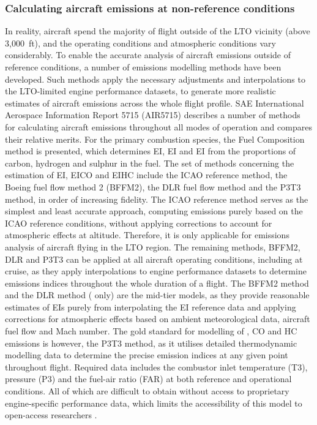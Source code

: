 \subsubsection{Calculating aircraft emissions at non-reference conditions}
In reality, aircraft spend the majority of flight outside of the LTO vicinity (above 3,000~ft), and the operating conditions and atmospheric conditions vary considerably. To enable the accurate analysis of aircraft emissions outside of reference conditions, a number of emissions modelling methods have been developed. Such methods apply the necessary adjustments and interpolations to the LTO-limited engine performance datasets, to generate more realistic estimates of aircraft emissions across the whole flight profile. SAE International Aerospace Information Report 5715 (AIR5715) \cite{AIR5715} describes a number of methods for calculating aircraft emissions throughout all modes of operation and compares their relative merits. For the primary combustion species, the Fuel Composition method is presented, which determines EI, EI and EI from the proportions of carbon, hydrogen and sulphur in the fuel. The set of methods concerning the estimation of EI, EICO and EIHC include the ICAO reference method, the Boeing fuel flow method 2 (BFFM2), the DLR fuel flow method and the P3T3 method, in order of increasing fidelity. The ICAO reference method serves as the simplest and least accurate approach, computing emissions purely based on the ICAO reference conditions, without applying corrections to account for atmospheric effects at altitude. Therefore, it is only applicable for emissions analysis of aircraft flying in the LTO region.  The remaining methods, BFFM2, DLR and P3T3 can be applied at all aircraft operating conditions, including at cruise, as they apply interpolations to engine performance datasets to determine emissions indices throughout the whole duration of a flight. The BFFM2 method and the DLR method ( only) are the mid-tier models, as they provide reasonable estimates of EIs purely from interpolating the EI reference data and applying corrections for atmospheric effects based on ambient meteorological data, aircraft fuel flow and Mach number. The gold standard for modelling of , CO and HC emissions is however, the P3T3 method, as it utilises detailed thermodynamic modelling data to determine the precise emission indices at any given point throughout flight. Required data includes the combustor inlet temperature (T3), pressure (P3) and the fuel-air ratio (FAR) at both reference and operational conditions. All of which are difficult to obtain without access to proprietary engine-specific performance data, which limits the accessibility of this model to open-access researchers \cite{Brink2020, Dubois2006}.

